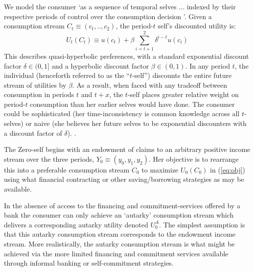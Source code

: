 \documentclass[11pt,english]{article}
\theoremstyle{plain}
\theoremstyle{definition}
\begin{document}
We model the consumer `as a sequence of temporal selves ... indexed
by their respective periods of control over the consumption decision
\citet[p.451]{laibson1997}'. Given a consumption stream $C_{t}\equiv\left(c_{t},..,c_{2}\right)$,
the period-$t$ self's discounted utility is: 
\begin{equation}
U_{t}\left(C_{t}\right)\equiv u\left(c_{t}\right)+\beta\sum\limits _{i=t+1}^{2}\delta^{i-t}u\left(c_{i}\right)\label{eq:obj}
\end{equation}
This describes quasi-hyperbolic preferences, with a standard exponential
discount factor $\delta\in(0,1]$ and a hyperbolic discount factor
$\beta\in(0,1)$. In any period $t$, the individual (henceforth referred
to as the ``$t$-self'') discounts the entire future stream of utilities
by $\beta$. As a result, when faced with any tradeoff between consumption
in periods $t$ and $t+x$, the $t$-self places greater relative
weight on period-$t$ consumption than her earlier selves would have
done. The consumer could be sophisticated (her time-inconsistency
is common knowledge across all $t$-selves) or naive (she believes
her future selves to be exponential discounters with a discount factor
of $\delta$). \citep{odonoghue2001}.

The Zero-self begins with an endowment of claims to an arbitrary positive
income stream over the three periods, $Y_{0}\equiv\left(y_{0},y_{1},y_{2}\right)$.
Her objective is to rearrange this into a preferable consumption stream
$C_{0}$ to maximize $U_{0}(C_{0})$ in (\ref{eq:obj}) using what
financial contracting or other saving/borrowing strategies as may
be available.

In the absence of access to the financing and commitment-services
offered by a bank the consumer can only achieve an `autarky' consumption
stream which delivers a corresponding autarky utility denoted $U_{0}^{A}$.
The simplest assumption is that this autarky consumption stream corresponds
to the endowment income stream. More realistically, the autarky consumption
stream is what might be achieved via the more limited financing and
commitment services available through informal banking or self-commitment
strategies.
\end{document}
